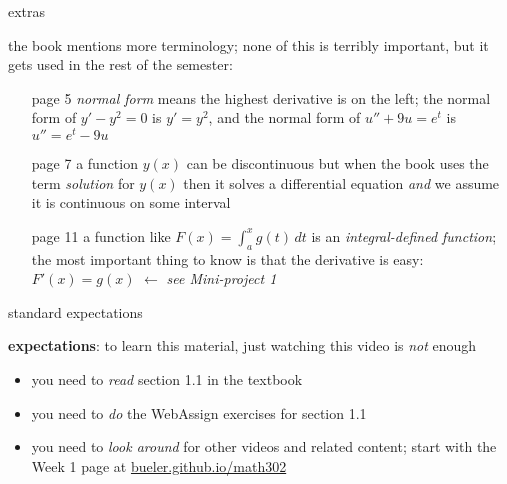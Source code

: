 \documentclass{beamer}
\begin{document}
\begin{frame}{extras}

the book mentions more terminology; none of this is terribly important, but it gets used in the rest of the semester:
\begin{itemize}
\item[page 5] \emph{normal form} means the highest derivative is on the left; the normal form of $y' - y^2=0$ is $y'=y^2$, and the normal form of $u''+9u=e^t$ is $u'' = e^t - 9u$
\item[page 7] a function $y(x)$ can be discontinuous but when the book uses the term \emph{solution} for $y(x)$ then it solves a differential equation \emph{and} we assume it is continuous on some interval
\item[page 11] a function like $F(x) = \int_a^x g(t)\,dt$ is an \emph{integral-defined function}; the most important thing to know is that the derivative is easy: $F'(x)=g(x)$ \hfill $\longleftarrow$ \emph{see Mini-project 1}
\end{itemize}
\end{frame}

\begin{frame}{standard expectations}

\textbf{expectations}:  to learn this material, just watching this video is \emph{not} enough
\begin{itemize}
\item you need to \emph{read} section 1.1 in the textbook
\item you need to \emph{do} the WebAssign exercises for section 1.1
\item you need to \emph{look around} for other videos and related content; start with the Week 1 page at \href{https://bueler.github.io/math302/}{bueler.github.io/math302}
\end{itemize}
\end{frame}
\end{document}
